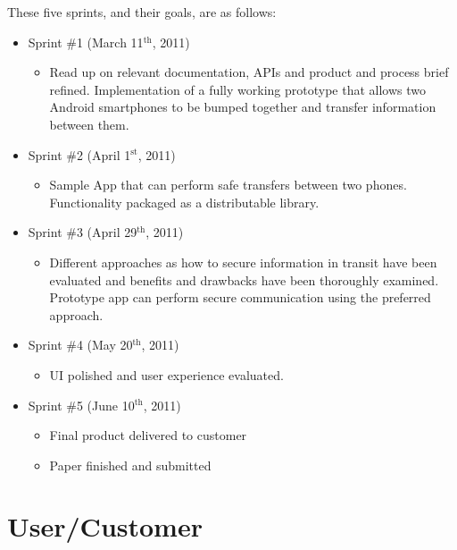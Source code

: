 \documentclass[a4paper,11pt]{article}
\begin{document}
These five sprints, and their goals, are as follows:
\begin{itemize}
	\item Sprint \#1 (March 11$^{\text{th}}$, 2011)
	\begin{itemize}
		\item Read up on relevant documentation, APIs and product and process brief refined. Implementation of a fully working prototype that allows two Android smartphones to be bumped together and transfer information between them.
	\end{itemize}
\pagebreak
	\item Sprint \#2 (April 1$^{\text{st}}$, 2011)
	\begin{itemize}
		\item Sample App that can perform safe transfers between two phones. Functionality packaged as a distributable library.
	\end{itemize}
	
	\item Sprint \#3 (April 29$^{\text{th}}$, 2011)
	\begin{itemize}
		\item Different approaches as how to secure information in transit have been evaluated and benefits and drawbacks have been thoroughly examined. Prototype app can perform secure communication using the preferred approach.
	\end{itemize}
	
	\item Sprint \#4 (May 20$^{\text{th}}$, 2011)
	\begin{itemize}
		\item UI polished and user experience evaluated.
	\end{itemize}
	
	\item Sprint \#5 (June 10$^{\text{th}}$, 2011)
	\begin{itemize}
		\item Final product delivered to customer
		\item Paper finished and submitted
	\end{itemize}
\end{itemize}


\section{User/Customer} %
\label{sec:user_customer}
\end{document}
